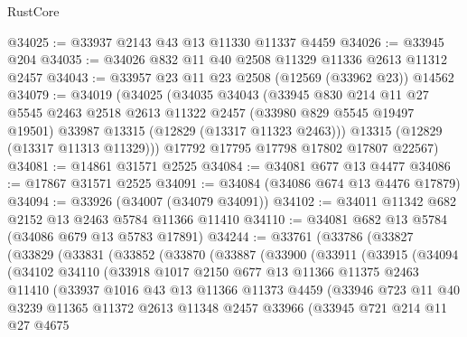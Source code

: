 \begin{lexlean}{RustCore}
\begin{coremodule}
@34025 := @33937 @2143 @43 @13 @11330 @11337 @4459
@34026 := @33945 @204
@34035 := @34026 @832 @11 @40 @2508 @11329 @11336 @2613 @11312 @2457
@34043 := @33957 @23 @11 @23 @2508 (@12569 (@33962 @23)) @14562
@34079 := @34019
    (@34025
      (@34035
        @34043
        (@33945
          @830
          @214
          @11
          @27
          @5545
          @2463
          @2518
          @2613
          @11322
          @2457
          (@33980 @829 @5545 @19497 @19501)
          @33987
          @13315
          (@12829 (@13317 @11323 @2463)))
        @13315
        (@12829 (@13317 @11313 @11329)))
      @17792
      @17795
      @17798
      @17802
      @17807
      @22567)
@34081 := @14861 @31571 @2525
@34084 := @34081 @677 @13 @4477
@34086 := @17867 @31571 @2525
@34091 := @34084 (@34086 @674 @13 @4476 @17879)
@34094 := @33926 (@34007 (@34079 @34091))
@34102 := @34011 @11342 @682 @2152 @13 @2463 @5784 @11366 @11410
@34110 := @34081 @682 @13 @5784 (@34086 @679 @13 @5783 @17891)
@34244 := @33761
    (@33786
      (@33827
        (@33829
          (@33831
            (@33852
              (@33870
                (@33887
                  (@33900
                    (@33911
                      (@33915
                        (@34094
                          (@34102
                            @34110
                            (@33918
                              @1017
                              @2150
                              @677
                              @13
                              @11366
                              @11375
                              @2463
                              @11410
                              (@33937
                                @1016
                                @43
                                @13
                                @11366
                                @11373
                                @4459
                                (@33946
                                  @723
                                  @11
                                  @40
                                  @3239
                                  @11365
                                  @11372
                                  @2613
                                  @11348
                                  @2457
                                  @33966
                                  (@33945
                                    @721
                                    @214
                                    @11
                                    @27
                                    @4675

\end{coremodule}
\end{lexlean}
